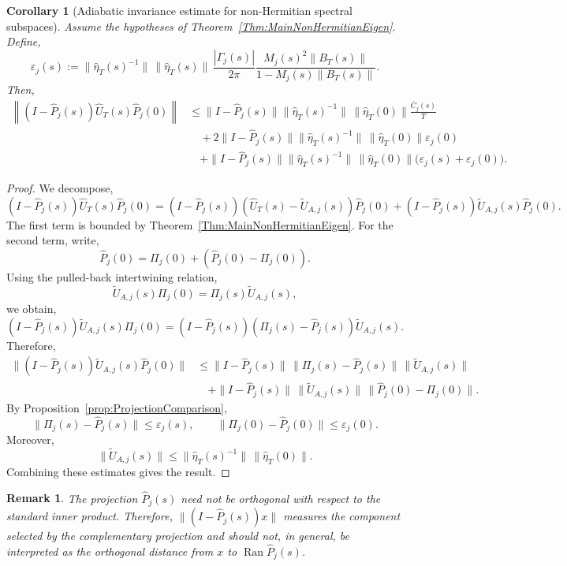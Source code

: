 \documentclass[pdflatex,sn-mathphys-num]{sn-jnl}
\theoremstyle{thmstyleone}
\newtheorem{corollary}[theorem]{Corollary}
\theoremstyle{thmstyletwo}
\newtheorem{remark}{Remark}
\theoremstyle{thmstylethree}
\begin{document}
\begin{corollary}[Adiabatic invariance estimate for non-Hermitian spectral subspaces]
\label{Cor:NonHermitianEigenspaceInvariance}
Assume the hypotheses of Theorem~\ref{Thm:MainNonHermitianEigen}.
Define,
\[
\varepsilon_j(s)
:=
\|\hat\eta_T(s)^{-1}\|\,\|\hat\eta_T(s)\|\,
\frac{|\Gamma_j(s)|}{2\pi}
\frac{M_j(s)^2\|B_T(s)\|}
{1-M_j(s)\|B_T(s)\|}.
\]
Then,
\[
\begin{aligned}
\left\|
(I-\hat P_j(s))\hat U_T(s)\hat P_j(0)
\right\|
&\le
\|I-\hat P_j(s)\|
\|\hat\eta_T(s)^{-1}\|\,\|\hat\eta_T(0)\|
\frac{\bar C_j(s)}{T}  \\
&\quad
+2\|I-\hat P_j(s)\|
\|\hat\eta_T(s)^{-1}\|\,\|\hat\eta_T(0)\|
\varepsilon_j(0) \\
&\quad
+\|I-\hat P_j(s)\|
\|\hat\eta_T(s)^{-1}\|\,\|\hat\eta_T(0)\|
\bigl(\varepsilon_j(s)+\varepsilon_j(0)\bigr).
\end{aligned}
\]
\end{corollary}

\begin{proof}
We decompose,
\[
(I-\hat P_j(s))\hat U_T(s)\hat P_j(0)
=
(I-\hat P_j(s))(\hat U_T(s)-\widetilde U_{A,j}(s))\hat P_j(0) +
(I-\hat P_j(s))\widetilde U_{A,j}(s)\hat P_j(0).
\]
The first term is bounded by Theorem~\ref{Thm:MainNonHermitianEigen}. For the
second term, write,
\[
\hat P_j(0)=\Pi_j(0)+(\hat P_j(0)-\Pi_j(0)).
\]
Using the pulled-back intertwining relation,
\[
\widetilde U_{A,j}(s)\Pi_j(0)=\Pi_j(s)\widetilde U_{A,j}(s),
\]
we obtain,
\[
(I-\hat P_j(s))\widetilde U_{A,j}(s)\Pi_j(0)
=
(I-\hat P_j(s))(\Pi_j(s)-\hat P_j(s))\widetilde U_{A,j}(s).
\]
Therefore,
\[
\begin{aligned}
\|(I-\hat P_j(s))\widetilde U_{A,j}(s)\hat P_j(0)\|
&\le
\|I-\hat P_j(s)\|\,
\|\Pi_j(s)-\hat P_j(s)\|\,
\|\widetilde U_{A,j}(s)\| \\
&\quad+
\|I-\hat P_j(s)\|\,
\|\widetilde U_{A,j}(s)\|\,
\|\hat P_j(0)-\Pi_j(0)\|.
\end{aligned}
\]
By Proposition~\ref{prop:ProjectionComparison},
\[
\|\Pi_j(s)-\hat P_j(s)\|\le \varepsilon_j(s),
\qquad
\|\Pi_j(0)-\hat P_j(0)\|\le \varepsilon_j(0).
\]
Moreover,
\[
\|\widetilde U_{A,j}(s)\|
\le
\|\hat\eta_T(s)^{-1}\|\,\|\hat\eta_T(0)\|.
\]
Combining these estimates gives the result.
\end{proof}

\begin{remark}
The projection \(\hat P_j(s)\) need not be orthogonal with respect to the
standard inner product. Therefore,
\(
\|(I-\hat P_j(s))x\|
\)
measures the component selected by the complementary projection and should not,
in general, be interpreted as the orthogonal distance from \(x\) to
\(\operatorname{Ran}\hat P_j(s)\).
\end{remark}
\end{document}

